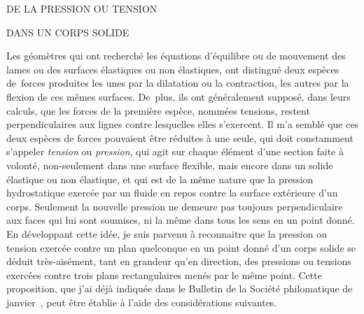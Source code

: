 \documentclass[11pt, twoside, leqno]{article}
\begin{document}
\leavevmode\thispagestyle{empty}\newpage

\setcounter{page}{42}

\thispagestyle{empty}
\begin{center}
\vspace*{1.8em}
{\LARGE DE LA PRESSION OU TENSION}

{\Large DANS UN CORPS SOLIDE}
\vspace*{4.4em}
\end{center}

Les géomètres qui ont recherché les équations d'équilibre ou de mouvement des lames ou des surfaces élastiques ou non élastiques, ont distingué deux espèces de~forces produites les unes par la dilatation ou la contraction, les autres par la flexion de ces mêmes surfaces. De~plus, ils ont généralement supposé, dans leurs calculs, que les forces de la première espèce, nommées tensions, restent perpendiculaires aux lignes contre lesquelles elles s'exercent. Il m'a semblé que ces deux espèces de forces pouvaient être réduites à une seule, qui doit constamment s'appeler \emph{tension} ou \emph{pression}, qui agit sur chaque élément d'une section faite à volonté, non-seulement dans une surface flexible, mais encore dans un solide élastique ou non élastique, et qui est de la même nature que la pression hydrostatique exercée par un fluide en repos contre la surface extérieure d'un corps. Seulement la nouvelle pression ne demeure pas toujours perpendiculaire aux faces qui lui sont soumises, ni la même dans tous les sens en un point donné. En développant cette idée, je suis parvenu à reconnaitre que la pression ou tension exercée contre un plan quelconque en un point donné d'un corps solide se déduit très-aisément, tant en grandeur qu'en direction, des pressions ou tensions exercées contre trois plans rectangulaires menés par le même point. Cette proposition, que j'ai déjà indiquée dans le Bulletin de la Société philomatique de janvier~, peut être établie à l'aide des considérations suivantes.
\end{document}
